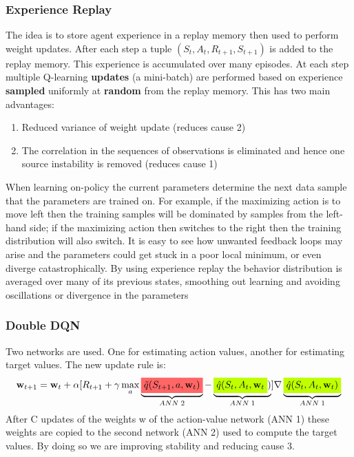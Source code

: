 \subsubsection{Experience Replay}
The idea is to store agent experience in a replay memory then used to perform weight updates. After each step a tuple $(S_t, A_t, R_{t+1}, S_{t+1})$ is added to the replay memory. This experience is accumulated over many episodes. At each step  multiple Q-learning \textbf{updates} (a mini-batch) are performed based on experience \textbf{sampled} uniformly at \textbf{random} from the replay memory.
This has two main advantages:
\begin{enumerate}
    \item Reduced variance of weight update (reduces cause 2)
    \item The correlation in the sequences of observations is eliminated and hence one source instability is removed (reduces cause 1)
\end{enumerate}
When learning on-policy the current parameters determine the next data sample that the parameters are trained on. For example, if the maximizing action is to move left then the training samples will be dominated by samples from the left-hand side; if the maximizing action then switches to the right then the training distribution will also switch. It is easy to see how unwanted feedback loops may arise and the parameters could get stuck in a poor local minimum, or even diverge catastrophically. By using experience replay the behavior distribution is averaged over many of its previous states, smoothing out learning and avoiding oscillations or divergence in the parameters

\subsubsection{Double DQN}
Two networks are used. One for estimating action values, another for estimating target values.
The new update rule is:
\begin{align}
    \mathbf{w}_{t+1}=\mathbf{w}_t+\alpha[R_{t+1}+\gamma\max_a\underbrace{\colorbox{red!60!white}{$\Tilde{q}(S_{t+1}, a, \mathbf{w}_t)$}}_{ANN\;2}-\underbrace{\colorbox{lime}{$\hat{q}(S_t, A_t, \mathbf{w}_t$})}_{ANN\;1}]\nabla \underbrace{\colorbox{lime}{$\hat{q}(S_t, A_t, \mathbf{w}_t)$}}_{ANN\;1}
\end{align}
After C updates of the weights w of the action-value network (ANN 1) these weights are copied to the second network (ANN 2) used to compute the target values. By doing so we are improving stability and reducing cause 3.

